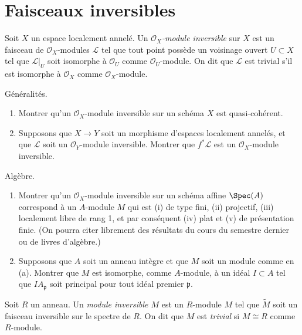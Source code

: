 \section{Faisceaux inversibles}
\label{section-invertible-sheaves}

\begin{definition}
\label{definition-invertible-sheaf}
Soit $X$ un espace localement annelé.
Un {\it ${\mathcal O}_X$-module inversible} sur $X$
est un faisceau de ${\mathcal O}_X$-modules ${\mathcal L}$ tel que tout point
possède un voisinage ouvert $U \subset X$ tel que ${\mathcal L}|_U$
soit isomorphe à ${\mathcal O}_U$ comme ${\mathcal O}_U$-module.
On dit que ${\mathcal L}$ est trivial s'il est isomorphe à
${\mathcal O}_X$ comme ${\mathcal O}_X$-module.
\end{definition}

\begin{exercise}
\label{exercise-general-facts-invertible}
Généralités.
\begin{enumerate}
\item Montrer qu'un ${\mathcal O}_X$-module inversible sur
un schéma $X$ est quasi-cohérent.
\item Supposons que $X\to Y$ soit un morphisme d'espaces localement annelés,
et que ${\mathcal L}$ soit un ${\mathcal O}_Y$-module inversible.
Montrer que $f^\ast {\mathcal L}$ est un ${\mathcal O}_X$-module inversible.
\end{enumerate}
\end{exercise}

\begin{exercise}
\label{exercise-invertible-algebra}
Algèbre.
\begin{enumerate}
\item Montrer qu'un ${\mathcal O}_X$-module inversible sur
un schéma affine $\Spec(A)$ correspond à un $A$-module $M$ qui est
(i) de type fini, (ii) projectif, (iii) localement libre de rang 1,
et par conséquent (iv) plat et (v) de présentation finie. (On pourra
citer librement des résultats du cours du semestre dernier ou de livres d'algèbre.)
\item Supposons que $A$ soit un anneau intègre et que $M$ soit
un module comme en (a). Montrer que $M$ est isomorphe, comme $A$-module,
à un idéal $I \subset A$ tel que $IA_{\mathfrak p}$ soit principal pour
tout idéal premier ${\mathfrak p}$.
\end{enumerate}
\end{exercise}

\begin{definition}
\label{definition-invertible-module}
Soit $R$ un anneau. Un {\it module inversible $M$} est un $R$-module
$M$ tel que $\widetilde M$ soit un faisceau inversible sur le
spectre de $R$. On dit que $M$ est {\it trivial} si $M \cong R$ comme
$R$-module.
\end{definition}

